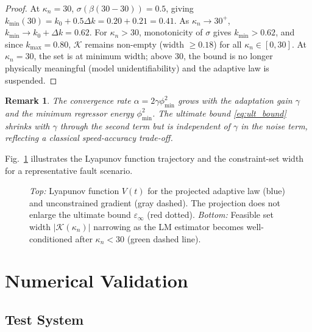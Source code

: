 \documentclass[journal]{IEEEtran}
\newtheorem{remark}{Remark}
\newcommand{\kappan}{\kappa_{n}}
\newcommand{\kmin}{k_{\min}}
\newcommand{\kmax}{k_{\max}}
\newcommand{\calK}{\mathcal{K}}
\begin{document}
\begin{proof}
At $\kappan = 30$, $\sigma(\beta(30 - 30)) = 0.5$, giving
$\kmin(30) = k_0 + 0.5\Delta k = 0.20 + 0.21 = 0.41$.
As $\kappan \to 30^+$, $\kmin \to k_0 + \Delta k = 0.62$.
For $\kappan > 30$, monotonicity of $\sigma$ gives
$\kmin > 0.62$, and since $\kmax = 0.80$, $\calK$ remains
non-empty (width $\geq 0.18$) for all $\kappan \in [0, 30]$.
At $\kappan = 30$, the set is at minimum width; above 30,
the bound is no longer physically meaningful (model
unidentifiability) and the adaptive law is suspended.
\end{proof}

\begin{remark}
The convergence rate $\alpha = 2\gamma\phi^2_{\min}$ grows
with the adaptation gain $\gamma$ and the minimum regressor
energy $\phi^2_{\min}$.  The ultimate bound \eqref{eq:ult_bound}
shrinks with $\gamma$ through the second term but is independent
of $\gamma$ in the noise term, reflecting a classical
speed-accuracy trade-off.
\end{remark}

Fig.~\ref{fig:lyap_conv} illustrates the Lyapunov function trajectory
and the constraint-set width for a representative fault scenario.

\begin{figure}[!t]
  \centering
  
  \caption{\emph{Top:} Lyapunov function $V(t)$ for the projected
           adaptive law (blue) and unconstrained gradient (gray
           dashed).  The projection does not enlarge the ultimate
           bound $\varepsilon_\infty$ (red dotted).
           \emph{Bottom:} Feasible set width $|\calK(\kappan)|$
           narrowing as the LM estimator becomes well-conditioned
           after $\kappan < 30$ (green dashed line).}
  \label{fig:lyap_conv}
\end{figure}

\section{Numerical Validation}
\label{sec:sim}

\subsection{Test System}
\end{document}
